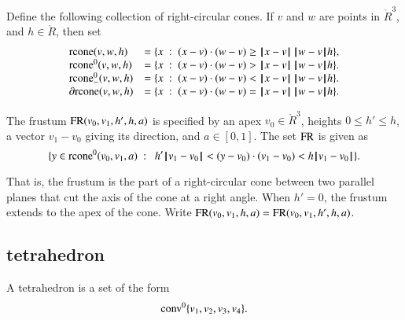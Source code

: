 \begin{definition}[rcone]
Define the following collection of right-circular cones.
If $v$ and $w$ are points in $\ring{R}^3$, and
  $h\in\ring{R}$, then set
  $$\begin{array}{lll}
    \op{rcone}(v,w,h) &= \{x\mid (x-v)\cdot (w-v) \ge \norm{x}{v}\,\norm{w}{v} h\},\\
    \op{rcone}^0(v,w,h) &= \{x\mid (x-v)\cdot (w-v) > \norm{x}{v}\,\norm{w}{v} h\}.\\
    \op{rcone}_-^0(v,w,h) &= \{x\mid (x-v)\cdot (w-v) < \norm{x}{v}\,\norm{w}{v} h\}.\\
    \partial\op{rcone}(v,w,h) &= \{x\mid (x-v)\cdot (w-v) = \norm{x}{v}\,\norm{w}{v} h\}.\\
    \end{array}
    $$
\end{definition}



\begin{definition}[frustum, FR] The frustum
${\operatorname{FR}}(v_0,v_1,h',h,a)$ is specified by an apex $v_0\in\ring{R}^3$, heights
$0\le h'\le h$, a vector $v_1-v_0$ giving its direction, and
$a\in[0,1]$. The set ${\operatorname{FR}}$ is given as
    $$
    \{ y \in\op{rcone}^0(v_0,v_1,a) \mid \ 
       h'\norm{v_1}{v_0} < (y-v_0) \cdot (v_1-v_0) < h\norm{v_1}{v_0} \}.
    $$
\end{definition}

That is, the frustum is the part of a right-circular cone between two
parallel planes that cut the axis of the cone at a right angle.
When $h'=0$, the frustum extends to the apex of the cone.
Write ${\operatorname{FR}}(v_0,v_1,h,a)={\operatorname{FR}}(v_0,v_1,h',h,a)$.

\subsection{tetrahedron}

\begin{definition}[tetrahedron] A tetrahedron is a set of the form
$${\operatorname{conv}}^0\{v_1,v_2,v_3,v_4\}.$$
\end{definition}

